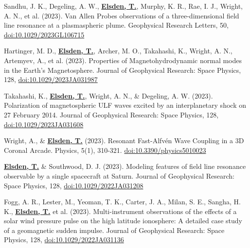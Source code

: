 \documentclass[11pt,a4paper]{article} %
\newcommand\vs{\vspace{-0.25cm}}
\begin{document}
\begin{etaremune}
\vspace{-0.5cm}

\vs
\item Sandhu, J. K., Degeling, A. W., \underline{\textbf{Elsden, T.}}, Murphy, K. R., Rae, I. J., Wright, A. N., et al. (2023). Van Allen Probes observations of a three-dimensional field line resonance at a plasmaspheric plume. Geophysical Research Letters, 50, 
\href{https://doi.org/10.1029/2023GL106715}{doi:10.1029/2023GL106715}
\vs


\item Hartinger, M. D., \underline{\textbf{Elsden, T.}}, Archer, M. O., Takahashi, K., Wright, A. N., Artemyev, A., et al. (2023). Properties of Magnetohydrodynamic normal modes in the Earth's Magnetosphere. Journal of Geophysical Research: Space Physics, 128, \href{https://doi.org/10.1029/2023JA031987}{doi:10.1029/2023JA031987}

\vs
\item Takahashi, K., \underline{\textbf{Elsden, T.}}, Wright, A. N., \& Degeling, A. W. (2023). Polarization of magnetospheric ULF waves excited by an interplanetary shock on 27 February 2014. Journal of Geophysical Research: Space Physics, 128, \href{https://doi.org/10.1029/2023JA031608}{doi:10.1029/2023JA031608}

\vs
\item Wright, A., \& \underline{\textbf{Elsden, T.}} (2023). Resonant Fast-Alfvén Wave Coupling in a 3D Coronal Arcade. Physics, 5(1), 310-321. \href{https://doi.org/10.3390/physics5010023}{doi:10.3390/physics5010023}

\vs
\item \underline{\textbf{Elsden, T.}} \& Southwood, D. J. (2023). Modeling features of field line resonance observable by a single spacecraft at Saturn. Journal of Geophysical Research: Space Physics, 128, \href{https://doi.org/10.1029/2022JA031208}{doi:10.1029/2022JA031208}

\vs
\item Fogg, A. R., Lester, M., Yeoman, T. K., Carter, J. A., Milan, S. E., Sangha, H. K.,  \underline{\textbf{Elsden, T.}} et al. (2023). Multi-instrument observations of the effects of a solar wind pressure pulse on the high latitude ionosphere: A detailed case study of a geomagnetic sudden impulse. Journal of Geophysical Research: Space Physics, 128, \href{https://doi.org/10.1029/2022JA031136}{doi:10.1029/2022JA031136}

\vspace{-0.5cm}


\end{etaremune}
\end{document}
